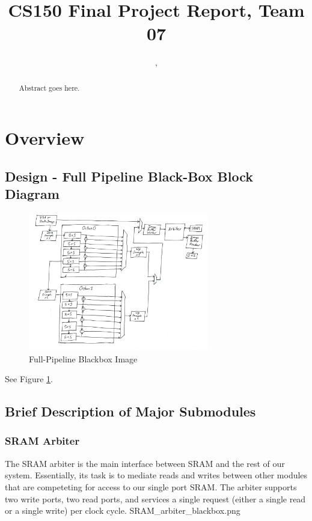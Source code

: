 \documentclass[12pt]{article}
\title{CS150 Final Project Report, Team 07}
\author{\Name, \texttt{\Login}}
\begin{document}
\maketitle

\begin{abstract}

Abstract goes here.

\end{abstract}

\newpage

\section{Overview}

\subsection{Design - Full Pipeline Black-Box Block Diagram}

\begin{figure}
    \centering
    \includegraphics[width=0.7\textwidth]{processed_image_pngs/full_pipe_blackbox.png}
    \caption{Full-Pipeline Blackbox Image}
    \label{fig:full_pipe}
\end{figure}

See Figure \ref{fig:full_pipe}.


\subsection{Brief Description of Major Submodules}

\subsubsection{SRAM Arbiter}

The SRAM arbiter is the main interface between SRAM and the rest of our system.
Essentially, its task is to mediate reads and writes between other modules that
are competeting for access to our single port SRAM. The arbiter supports two 
write ports, two read ports, and services a single request (either a single 
read or a single write) per clock cycle.
SRAM\_arbiter\_blackbox.png
\end{document}
